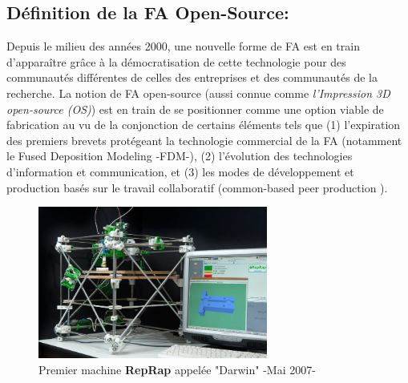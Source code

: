	\subsection*{Définition de la FA Open-Source:}
Depuis le milieu des années 2000, une nouvelle forme de FA est en train d'apparaître grâce à la démocratisation de cette technologie pour des communautés différentes de celles des entreprises et des communautés de la recherche.
La notion de FA open-source (aussi connue comme  \textit{l'Impression 3D open-source (OS)}) est en train de se positionner comme une option viable de fabrication au vu de la conjonction de certains éléments tels que 
(1) l'expiration des premiers brevets protégeant la technologie commercial de la FA (notamment le Fused Deposition Modeling -FDM-), 
(2) l'évolution des technologies d'information et communication, et 
(3) les modes de développement et production basés sur le travail collaboratif (common-based peer production \parencite{Grodzinsky2006}). 




\begin{figure} [H]
	\centering
	\includegraphics[height=5cm]{Figures/Francais/Darwing-RepRap.jpg}
	\caption[]{Premier machine \textbf{RepRap} appelée "Darwin" -Mai 2007-}
	\label{Darwing.RepRap}
\end{figure}	


